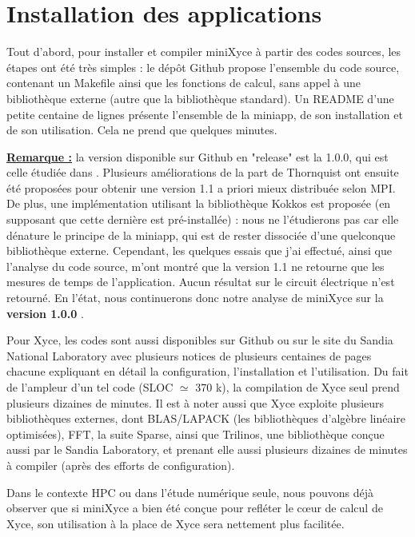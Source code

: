 \documentclass[11pt,a4paper,oneside]{memoir}
\theoremstyle{definition}
\theoremstyle{remark}
\theoremstyle{plain}
\begin{document}
\section{Installation des applications}

Tout d'abord, pour installer et compiler miniXyce à partir des codes sources, les étapes ont été très simples : le dépôt Github \cite{minixyce-code} propose l'ensemble du code source, contenant un Makefile ainsi que les fonctions de calcul, sans appel à une bibliothèque externe (autre que la bibliothèque standard). Un README d'une petite centaine de lignes présente l'ensemble de la miniapp, de son installation et de son utilisation. Cela ne prend que quelques minutes.

\underline{\textbf{Remarque :}} la version disponible sur Github en "release" est la 1.0.0, qui est celle étudiée dans \cite{minixyce-validation}. Plusieurs améliorations de la part de Thornquist ont ensuite été proposées pour obtenir une version 1.1 a priori mieux distribuée selon MPI. De plus, une implémentation utilisant la bibliothèque Kokkos est proposée (en supposant que cette dernière est pré-installée) : nous ne l'étudierons pas car elle dénature le principe de la miniapp, qui est de rester dissociée d'une quelconque bibliothèque externe. Cependant, les quelques essais que j'ai effectué, ainsi que l'analyse du code source, m'ont montré que la version 1.1 ne retourne que les mesures de temps de l'application. Aucun résultat sur le circuit électrique n'est retourné. En l'état, nous continuerons donc notre analyse de miniXyce sur la \textbf{version 1.0.0} .\bigskip


Pour Xyce, les codes sont aussi disponibles sur Github ou sur le site du Sandia National Laboratory \cite{xyce} avec plusieurs notices de plusieurs centaines de pages chacune expliquant en détail la configuration, l'installation et l'utilisation. Du fait de l'ampleur d'un tel code (SLOC $\simeq$ 370 k), la compilation de Xyce seul prend plusieurs dizaines de minutes. Il est à noter aussi que Xyce exploite plusieurs bibliothèques externes, dont BLAS/LAPACK (les bibliothèques d'algèbre linéaire optimisées), FFT, la suite Sparse, ainsi que Trilinos, une bibliothèque conçue aussi par le Sandia Laboratory, et prenant elle aussi plusieurs dizaines de minutes à compiler (après des efforts de configuration).\bigskip

Dans le contexte HPC ou dans l'étude numérique seule, nous pouvons déjà observer que si miniXyce a bien été conçue pour refléter le cœur de calcul de Xyce, son utilisation à la place de Xyce sera nettement plus facilitée.
\end{document}
